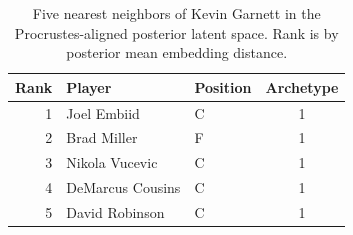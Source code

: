 \begin{table}[htbp]
  \centering\small
  \begin{tabular}{rllc}
    \toprule
    Rank & Player & Position & Archetype \\
    \midrule
    1 & Joel Embiid & C & 1 \\
    2 & Brad Miller & F & 1 \\
    3 & Nikola Vucevic & C & 1 \\
    4 & DeMarcus Cousins & C & 1 \\
    5 & David Robinson & C & 1 \\
    \bottomrule
  \end{tabular}
  \caption{Five nearest neighbors of Kevin Garnett in the Procrustes-aligned posterior latent space. Rank is by posterior mean embedding distance.}
  \label{tab:Kevin_Garnett_neighbors}
\end{table}

